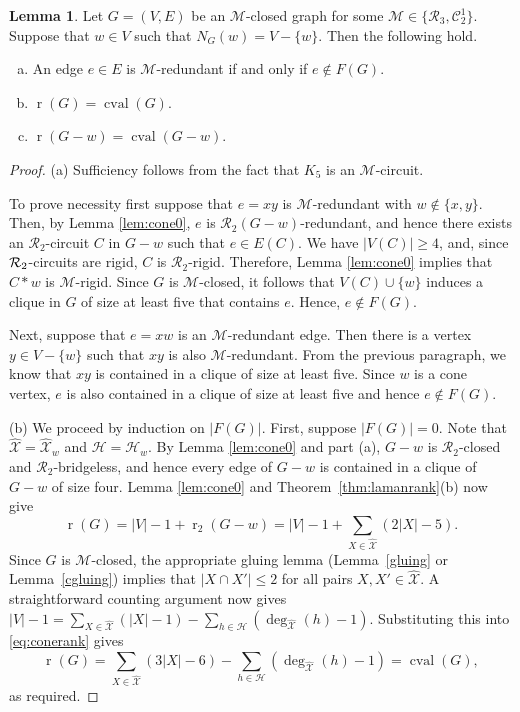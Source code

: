 \documentclass[11pt,a4paper]{article}
\theoremstyle{definition}
\newtheorem{lemma}[theorem]{Lemma}
\DeclareMathOperator{\rr}{r}
\DeclareMathOperator{\cval}{cval}
\newcommand{\cR}{\mathcal{R}}
\newcommand{\cM}{\mathcal{M}}
\newcommand{\hXX}{\hat{\mathcal{X}}}
\newcommand{\cC}{\mathcal{C}}
\newcommand{\HH}{\mathcal{H}}
\begin{document}
\begin{lemma}\label{lem:cone:rcdress}
Let  $G=(V,E)$ be an $\cM$-closed graph for some  $\cM\in \{\cR_3,\cC_2^1\}$. Suppose that $w\in V$ such that $N_G(w)=V-\{w\}$. 
Then the following hold.
\begin{enumerate}[(a)]
\item An edge $e\in E$ is $\mathcal{M}$-redundant if and only if $e\notin F(G)$.
\item $\rr(G)=\cval(G)$. %
\item $\rr(G-w)=\cval(G-w)$.
\end{enumerate}
\end{lemma}
\begin{proof}
(a) Sufficiency follows from the fact that $K_5$ is an $\cM$-circuit. 

To prove necessity first suppose that $e=xy$ is $\cM$-redundant with $w\notin \{x,y\}$. 
Then, by 
Lemma \ref{lem:cone0}, $e$ is $\mathcal{R}_2(G-w)$-redundant, and hence there exists an $\mathcal{R}_2$-circuit $C$ in  $G-w$ such that $e\in E(C)$.
We have $|V(C)|\geq 4$, and, since ${\cal R}_2$-circuits are rigid,
$C$ is $\mathcal{R}_2$-rigid. Therefore, 
Lemma \ref{lem:cone0} implies that $C*w$ is $\mathcal{M}$-rigid. Since $G$ is  $\mathcal{M}$-closed, it follows that $V(C)\cup \{w\}$ induces a clique in $G$ of size at least five that contains $e$. Hence, $e\notin F(G)$.

Next, suppose that  $e=xw$ is an $\cM$-redundant edge. Then there is a vertex $y\in V-\{w\}$ such that $xy$ is also $\cM$-redundant. 
From the previous paragraph, we know that $xy$ is contained in a clique %
of size at least five. Since $w$ is a cone vertex, $e$ is also contained in a clique 
of size at least five and hence $e\notin F(G)$.
\medskip

(b) We proceed by induction on $|F(G)|$. First, suppose $|F(G)|=0.$ Note that $\hXX=\hXX_w$ and $\mathcal{H}=\mathcal{H}_w$. 
By 
Lemma \ref{lem:cone0} and part (a), $G-w$ is $\mathcal{R}_2$-closed and $\cR_2$-bridgeless, and hence every edge of $G-w$ is contained in a clique of $G-w$ of size four. 
Lemma \ref{lem:cone0} and Theorem~\ref{thm:lamanrank}(b) now give
\begin{equation}\label{eq:conerank}
\rr(G)=|V|-1+\rr_2(G-w)=|V|-1+\sum_{X\in \hXX}(2|X|-5).
\end{equation}
Since $G$ is $\cM$-closed, the appropriate gluing lemma
(Lemma~\ref{gluing} or Lemma~\ref{cgluing}) implies that
$|X\cap X'|\leq 2$ for all pairs $X,X'\in \hXX$.
A straightforward counting argument now gives $|V|-1=\sum_{X\in \hXX}(|X|-1) - \sum_{h\in \HH}(\deg_{\hXX}(h)-1).$ 	
Substituting this into \eqref{eq:conerank} gives
$$\rr(G)=\sum_{X\in \hXX}(3|X|-6)-\sum_{h\in \mathcal{H}}(\deg_{\hXX}(h)-1)=\cval(G),$$
as required.


\end{proof}
\end{document}
